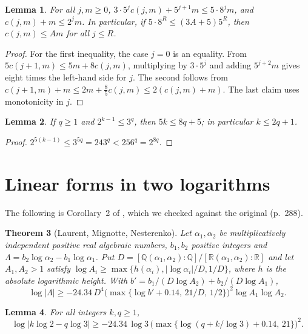 \documentclass[11pt]{amsart}
\newtheorem{theorem}{Theorem}[section]
\newtheorem{lemma}[theorem]{Lemma}
\theoremstyle{definition}
\theoremstyle{remark}
\begin{document}
\begin{lemma}\label{lem:geometric}
For all $j,m\ge0$, $3\cdot5^{j}c(j,m)+5^{j+1}m\le5\cdot8^{j}m$, and $c(j,m)+m\le2^{j}m$. In particular, if $5\cdot8^{R}\le(3A+5)5^{R}$, then $c(j,m)\le Am$ for all $j\le R$.
\end{lemma}

\begin{proof}
For the first inequality, the case $j=0$ is an equality. From $5c(j+1,m)\le5m+8c(j,m)$, multiplying by $3\cdot5^{j}$ and adding $5^{j+2}m$ gives eight times the left-hand side for $j$. The second follows from $c(j+1,m)+m\le2m+\tfrac85c(j,m)\le2(c(j,m)+m)$. The last claim uses monotonicity in $j$.
\end{proof}

\begin{lemma}\label{lem:time}
If $q\ge1$ and $2^{k-1}\le3^{q}$, then $5k\le8q+5$; in particular $k\le2q+1$.
\end{lemma}

\begin{proof}
$2^{5(k-1)}\le3^{5q}=243^{q}<256^{q}=2^{8q}$.
\end{proof}

\section{Linear forms in two logarithms}\label{sec:lmn}

The following is Corollary~2 of \cite{LMN95}, which we checked against the original (p.~288).

\begin{theorem}[Laurent, Mignotte, Nesterenko]\label{thm:lmn}
Let $\alpha_1,\alpha_2$ be multiplicatively independent positive real algebraic numbers, $b_1,b_2$ positive integers and $\Lambda=b_2\log\alpha_2-b_1\log\alpha_1$. Put $D=[\mathbb{Q}(\alpha_1,\alpha_2):\mathbb{Q}]/[\mathbb{R}(\alpha_1,\alpha_2):\mathbb{R}]$ and let $A_1,A_2>1$ satisfy $\log A_i\ge\max\{h(\alpha_i),|\log\alpha_i|/D,1/D\}$, where $h$ is the absolute logarithmic height. With $b'=b_1/(D\log A_2)+b_2/(D\log A_1)$,
\[
\log|\Lambda|\ge-24.34\,D^{4}\bigl(\max\{\log b'+0.14,\,21/D,\,1/2\}\bigr)^{2}\log A_1\log A_2 .
\]
\end{theorem}

\begin{lemma}\label{lem:lmn23}
For all integers $k,q\ge1$,
\[
\log|k\log2-q\log3|\ge-24.34\,\log3\,\bigl(\max\{\log(q+k/\log3)+0.14,\,21\}\bigr)^{2}.
\]
\end{lemma}
\end{document}
